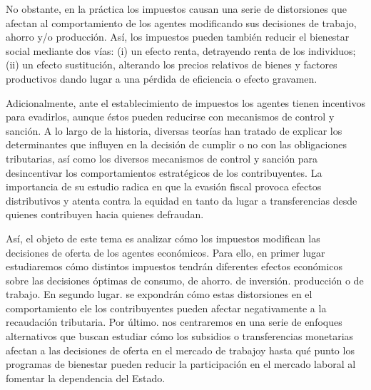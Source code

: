 \documentclass[10pt,a4paper]{article}
\begin{document}
No obstante, en la práctica los impuestos causan una serie de distorsiones que afectan al comportamiento de los agentes modificando sus  decisiones de trabajo, ahorro y/o producción. Así, los impuestos pueden también reducir el bienestar social mediante dos vías: (i) un efecto renta, detrayendo renta de los individuos; (ii) un efecto sustitución, alterando los precios relativos de bienes y factores productivos dando lugar a una pérdida de eficiencia o efecto gravamen.

Adicionalmente, ante el establecimiento de impuestos los agentes tienen incentivos para evadirlos, aunque éstos pueden reducirse con mecanismos de control y sanción. A lo largo de la historia, diversas teorías han tratado de explicar los determinantes que influyen en la decisión de cumplir o no con las obligaciones tributarias, así como los diversos mecanismos de control y sanción para desincentivar los comportamientos estratégicos de los contribuyentes. La importancia de su estudio radica en que la evasión fiscal provoca efectos distributivos y atenta contra la equidad en tanto da lugar a transferencias desde quienes contribuyen hacia quienes defraudan.

Así, el objeto de este tema es analizar cómo los impuestos modifican las decisiones de oferta de los agentes económicos. Para ello, en primer lugar estudiaremos cómo distintos impuestos tendrán diferentes efectos económicos sobre las decisiones óptimas de consumo, de ahorro. de inversión. producción o de trabajo. En segundo lugar. se expondrán cómo estas distorsiones en el comportamiento ele los contribuyentes pueden afectar negativamente a la recaudación tributaria. Por último. nos centraremos en una serie de enfoques alternativos que buscan estudiar cómo los subsidios o transferencias monetarias afectan a las decisiones de oferta en el mercado de trabajoy hasta qué punto los programas de bienestar pueden reducir la participación en el mercado laboral al fomentar la dependencia del Estado.





\clearpage
\end{document}
